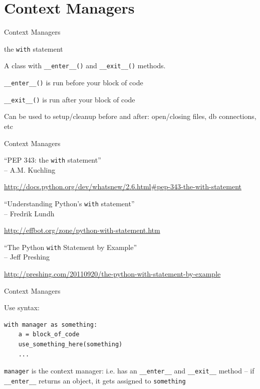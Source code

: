 \documentclass{beamer}
\begin{document}
\section{Context Managers}

\begin{frame}[fragile]{Context Managers}

{\LARGE the \verb|with| statement}

\vfill
{\Large A class with \verb|__enter__()| and \verb|__exit__()| methods.}
 
\vfill
{\Large \verb|__enter__()| is run before your block of code}

\vfill
{\Large \verb|__exit__()| is run after your block of code}

\vfill
{\Large Can be used to setup/cleanup before and after: open/closing files, db connections, etc}
\end{frame} 

\begin{frame}[fragile]{Context Managers}

{\Large ``PEP 343: the \verb|with| statement''} \\
\hspace{0.2in}  -- A.M. Kuchling

\url{http://docs.python.org/dev/whatsnew/2.6.html#pep-343-the-with-statement}

\vfill
{\Large ``Understanding Python's \verb|with| statement''} \\
\hspace{0.2in}  -- Fredrik Lundh 

\url{http://effbot.org/zone/python-with-statement.htm}

\vfill
{\Large ``The Python \verb|with| Statement by Example''} \\
\hspace{0.2in}  -- Jeff Preshing 

\url{http://preshing.com/20110920/the-python-with-statement-by-example}

\end{frame} 


\begin{frame}[fragile]{Context Managers}

{\Large Use syntax:}

\begin{verbatim}
with manager as something:
    a = block_of_code
    use_something_here(something)
    ...
\end{verbatim}

\vfill
{\large
\verb`manager` is the context manager: i.e. has an \verb`__enter__` and \verb`__exit__` method -- if \verb`__enter__` returns an object, it gets assigned to \verb`something`
}

\vfill
\end{frame} 
\end{document}
